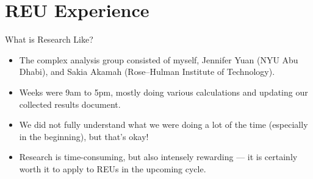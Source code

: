 \documentclass{reu_beamer}
\begin{document}
\section{REU Experience}
\begin{frame}{What is Research Like?}
  \begin{itemize}
    \item The complex analysis group consisted of myself, Jennifer Yuan (NYU Abu Dhabi), and Sakia Akamah (Rose--Hulman Institute of Technology).
    \item Weeks were 9am to 5pm, mostly doing various calculations and updating our collected results document.
    \item We did not fully understand what we were doing a lot of the time (especially in the beginning), but that's okay!
    \item Research is time-consuming, but also intensely rewarding --- it is certainly worth it to apply to REUs in the upcoming cycle.
  \end{itemize}
\end{frame}
\end{document}
